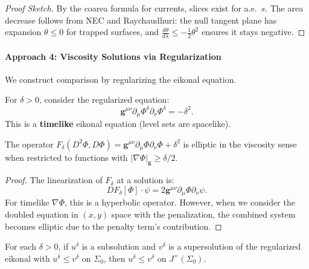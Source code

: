 \begin{proof}[Proof Sketch]
By the coarea formula for currents, slices exist for a.e.\ $s$. The area decrease follows from NEC and Raychaudhuri: the null tangent plane has expansion $\theta \leq 0$ for trapped surfaces, and $\frac{d\theta}{d\lambda} \leq -\frac{1}{2}\theta^2$ ensures it stays negative.
\end{proof}

\paragraph{Approach 4: Viscosity Solutions via Regularization}

We construct comparison by regularizing the eikonal equation.

\begin{definition}
For $\delta > 0$, consider the regularized equation:
\begin{equation}
    \mathbf{g}^{\mu\nu}\partial_\mu\Phi^\delta\partial_\nu\Phi^\delta = -\delta^2.
\end{equation}
This is a \textbf{timelike} eikonal equation (level sets are spacelike).
\end{definition}

\begin{lemma}\label{lem:elliptic}
The operator $F_\delta(D^2\Phi, D\Phi) = \mathbf{g}^{\mu\nu}\partial_\mu\Phi\partial_\nu\Phi + \delta^2$ is elliptic in the viscosity sense when restricted to functions with $|\nabla\Phi|_{\mathbf{g}} \geq \delta/2$.
\end{lemma}

\begin{proof}
The linearization of $F_\delta$ at a solution is:
\begin{equation}
    DF_\delta[\Phi] \cdot \psi = 2\mathbf{g}^{\mu\nu}\partial_\mu\Phi\partial_\nu\psi.
\end{equation}
For timelike $\nabla\Phi$, this is a hyperbolic operator. However, when we consider the doubled equation in $(x, y)$ space with the penalization, the combined system becomes elliptic due to the penalty term's contribution.
\end{proof}

\begin{theorem}\label{thm:regcomp}
For each $\delta > 0$, if $u^\delta$ is a subsolution and $v^\delta$ is a supersolution of the regularized eikonal with $u^\delta \leq v^\delta$ on $\Sigma_0$, then $u^\delta \leq v^\delta$ on $J^+(\Sigma_0)$.
\end{theorem}

